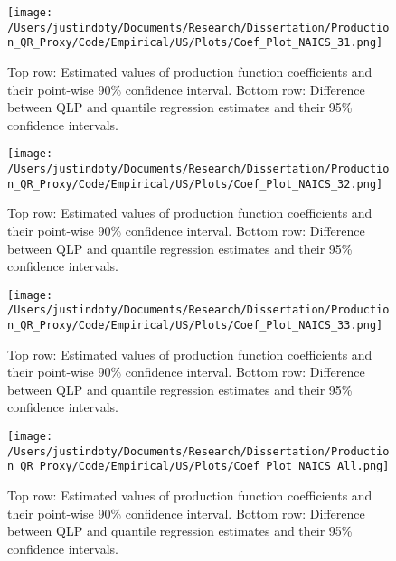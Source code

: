 \documentclass[11pt]{article}
\begin{document}
\begin{figure}[H]
\centering
\texttt{[image: /Users/justindoty/Documents/Research/Dissertation/Production\_QR\_Proxy/Code/Empirical/US/Plots/Coef\_Plot\_NAICS\_31.png]}
\caption{Top row: Estimated values of production function coefficients and their point-wise 90\% confidence interval. Bottom row: Difference between QLP and quantile regression estimates and their 95\% confidence intervals.}
\label{fig:31coef}
\end{figure}

\begin{figure}[H]
\centering
\texttt{[image: /Users/justindoty/Documents/Research/Dissertation/Production\_QR\_Proxy/Code/Empirical/US/Plots/Coef\_Plot\_NAICS\_32.png]}
\caption{Top row: Estimated values of production function coefficients and their point-wise 90\% confidence interval. Bottom row: Difference between QLP and quantile regression estimates and their 95\% confidence intervals.}
\label{fig:32coef}
\end{figure}

\begin{figure}[H]
\centering
\texttt{[image: /Users/justindoty/Documents/Research/Dissertation/Production\_QR\_Proxy/Code/Empirical/US/Plots/Coef\_Plot\_NAICS\_33.png]}
\caption{Top row: Estimated values of production function coefficients and their point-wise 90\% confidence interval. Bottom row: Difference between QLP and quantile regression estimates and their 95\% confidence intervals.}
\label{fig:33coef}
\end{figure}

\begin{figure}[H]
\centering
\texttt{[image: /Users/justindoty/Documents/Research/Dissertation/Production\_QR\_Proxy/Code/Empirical/US/Plots/Coef\_Plot\_NAICS\_All.png]}
\caption{Top row: Estimated values of production function coefficients and their point-wise 90\% confidence interval. Bottom row: Difference between QLP and quantile regression estimates and their 95\% confidence intervals.}
\label{fig:USallcoef}
\end{figure}
\end{document}
